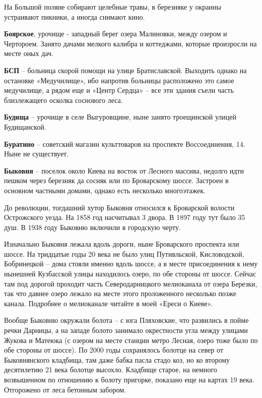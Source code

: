 На Большой поляне собирают целебные травы, в березняке у окраины устраивают пикники, а иногда снимают кино.\\

\medskip

\textbf{Боярское}, урочище - западный берег озера Малиновки, между озером и Чертороем. Занято дачами мелкого калибра и коттеджами, которые произросли на месте оных дач.\\

\medskip


\textbf{БСП} – больница скорой помощи на улице Братиславской. Выходить однако на остановке «Медучилище», ибо напротив больницы расположено это самое медучилище, а рядом еще и «Центр Сердца» – все эти здания съели часть близлежащего осколка соснового леса.\\

\medskip

\textbf{Будища} – урочище в селе Выгуровщине, ныне занято троещинской улицей Будищанской.\\

\medskip

\textbf{Буратино} – советский магазин культтоваров на проспекте Воссоединения, 14. Ныне не существует.\\

\medskip

\textbf{Быковня} – поселок около Киева на восток от Лесного массива, недолго идти пешком через березняк да сосняк или по Броварскому шоссе. Застроен в основном частными домами, однако есть несколько многоэтажек.

До революции, тогдашний хутор Быковня относился к Броварской волости Острожского уезда. На 1858 год насчитывал 3 двора. В 1897 году тут было 35 душ. В 1938 году Быковню включили в городскую черту.
 
Изначально Быковня лежала вдоль дороги, ныне Броварского проспекта или шоссе. На тридцатые годы 20 века не было улиц Путивльской, Кисловодской, Бобринецкой – дома стояли именно вдоль шоссе, а в месте присоединения к нему нынешней Кузбасской улицы находилось озеро, по обе стороны от шоссе. Сейчас там под дорогой проходит часть Северодарницкого мелиоканала от озера Березки, так что давнее озеро лежало на месте этого проложенного несколько позже канала. Подробнее о мелиоканале читайте в моей «Ереси о Киеве».
   
Вообще Быковню окружали болота – с юга Пляховские, что развились в пойме речки Дарницы, а на западе болото занимало окрестности угла между улицами Жукова и Матеюка (с озером на месте станции метро Лесная, озеро тоже было по обе стороны от шоссе). По 2000 годы сохранялось болотце на север от Быковнянского кладбища, там даже бабка пасла стадо коз, но ко второму десятилетию 21 века болотце высохло. Кладбище старое, на немного возвышенном по отношению к болоту пригорке, показано еще на картах 19 века. Отгорожено от леса бетонным забором.


